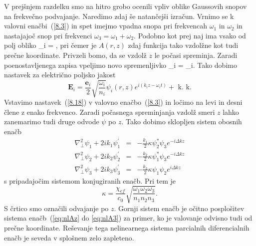 V prejšnjem razdelku smo na hitro grobo ocenili vpliv oblike Gaussovih snopov
na frekvečno podvajanje. Naredimo zdaj še natančejši izračun. Vrnimo se k valovni
enačbi~(\ref{8.3}) in spet imejmo vpadna snopa pri frekvencah
$\omega_{1}$ in $\omega_{2}$ in nastajajoč snop pri frekvenci
$\omega_{3}=\omega_{1}+\omega_{2}$.
Podobno kot prej naj ima vsako od polj obliko 
\beq
{}_{i}  = ,
\eeq
pri čemer je $A(r,z)$ zdaj funkcija tako vzdolžne kot tudi prečne koordinate. Privzeli
bomo, da se vzdolž $z$ le počasi spreminja.
Zaradi poenostavljenega zapisa vpeljimo novo spremenljivko 
\beq
\psi_i = _i.
\eeq
Tako dobimo nastavek za električno poljsko jakost
\begin{equation}
\mathbf{E}_{i}=\frac{\mathbf{e}_{i}}{2}\sqrt{\frac{\omega_{i}}{n_{i}}}\psi_{i}(r,z)
e^{i(k_{i}z-\omega_{i}t)}+\mbox{ k. k.}
\label{8.18}
\end{equation}
Vstavimo nastavek~(\ref{8.18}) v valovno
enačbo~(\ref{8.3}) in ločimo na levi in desni člene z enako frekvenco.
Zaradi počasnega spreminjanja vzdolž smeri $z$ lahko zanemarimo tudi druge odvode 
$\psi$ po $z$. Tako dobimo sklopljen sistem obosnih enačb 
\begin{eqnarray}
\nabla_{\perp}^{2}\psi_{1}+2ik_{1}\psi_{1}^{\prime} & = & -
\frac{k_{1}}{2}\kappa\psi_{2}^{\ast}\psi_{3}e^{-i\Delta kz}\\
\nabla_{\perp}^{2}\psi_{2}+2ik_{2}\psi_{2}^{\prime} & = & -
\frac{k_{2}}{2}\kappa\psi_{1}^{\ast}\psi_{3}e^{-i\Delta kz}\\
\nabla_{\perp}^{2}\psi_{3}+2ik_{3}\psi_{3}^{\prime} & =
& - \frac{k_{3}}{2}\kappa\psi_{1}\psi_{2}e^{i\Delta kz}
\label{SHGGauss_3}
\end{eqnarray}
s pripadajočim sistemom konjugiranih enačb. Pri tem je 
\begin{equation}
\kappa=\frac{\chi_{ef}}{c_0} \sqrt{\frac{\omega_{1}\omega_{2}\omega_{3}}{n_{1}n_{2}n_{3}}}.
\label{8.20}
\end{equation}
S črtico smo označili odvajanje po $z$. Gornji sistem enačb je očitno
posplošitev sistema enačb~(\ref{eq:nlAz} do \ref{eq:nlA3}) za primer, ko je valovanje odvisno
tudi od prečne koordinate. Reševanje tega nelinearnega sistema parcialnih
diferencialnih enačb je seveda v splošnem zelo zapleteno.

